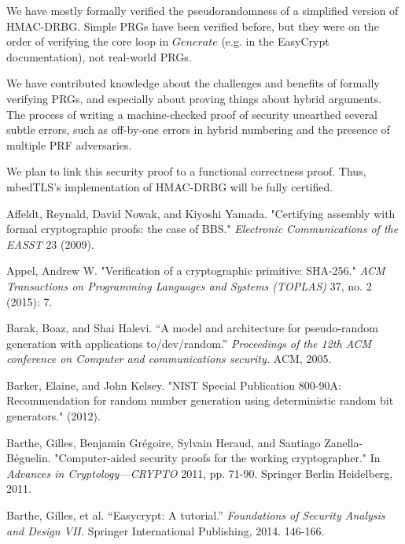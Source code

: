 \documentclass[12pt,lot, lof]{puthesis}
\begin{document}
{We have mostly formally verified the pseudorandomness of a simplified version of HMAC-DRBG. Simple PRGs have been verified before, but they were on the order of verifying the core loop in $Generate$ (e.g. in the EasyCrypt documentation), not real-world PRGs.

We have contributed knowledge about the challenges and benefits of formally verifying PRGs, and especially about proving things about hybrid arguments. The process of writing a machine-checked proof of security unearthed several subtle errors, such as off-by-one errors in hybrid numbering and the presence of multiple PRF adversaries.

We plan to link this security proof to a functional correctness proof. Thus, mbedTLS's implementation of HMAC-DRBG will be fully certified.




\begin{thebibliography}{99}

Affeldt, Reynald, David Nowak, and Kiyoshi Yamada. "Certifying assembly with formal cryptographic proofs: the case of BBS." \emph{Electronic Communications of the EASST} 23 (2009).

Appel, Andrew W. "Verification of a cryptographic primitive: SHA-256." \emph{ACM Transactions on Programming Languages and Systems (TOPLAS)} 37, no. 2 (2015): 7.

Barak, Boaz, and Shai Halevi. ``A model and architecture for pseudo-random generation with applications to/dev/random.'' \emph{Proceedings of the 12th ACM conference on Computer and communications security.} ACM, 2005. 

Barker, Elaine, and John Kelsey. "NIST Special Publication 800-90A: Recommendation for random number generation using deterministic random bit generators." (2012).

Barthe, Gilles, Benjamin Gr{\'e}goire, Sylvain Heraud, and Santiago Zanella-B{\'e}guelin. "Computer-aided security proofs for the working cryptographer." In \emph{Advances in Cryptology---CRYPTO} 2011, pp. 71-90. Springer Berlin Heidelberg, 2011.

Barthe, Gilles, et al. ``Easycrypt: A tutorial.'' \emph{Foundations of Security Analysis and Design VII.} Springer International Publishing, 2014. 146-166.


\end{thebibliography}}
\end{document}
